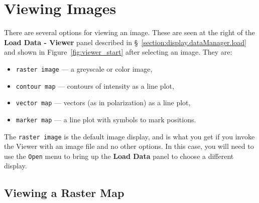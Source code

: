 \section{Viewing Images}
\label{section:display.image}

There are several options for viewing an image.  These are seen
at the right of the {\bf Load Data - Viewer} panel 
described in \S~\ref{section:display.dataManager.load} and shown in 
Figure~\ref{fig:viewer_start} after selecting an image.  They are:
\begin{itemize}
   \item {\tt raster image} --- a greyscale or color image,
   \item {\tt contour map} --- contours of intensity as a line plot,
   \item {\tt vector map} --- vectors (as in polarization) as a line plot,
   \item {\tt marker map} --- a line plot with symbols to mark positions.
\end{itemize}

The {\tt raster image} is the default image display, and is what you
get if you invoke the Viewer with an image file and no other options.  
In this case, you will need to use the {\tt Open} menu to
bring up the {\bf Load Data} panel to choose a different display.

%


\subsection{Viewing a Raster Map}
\label{section:display.image.raster}


